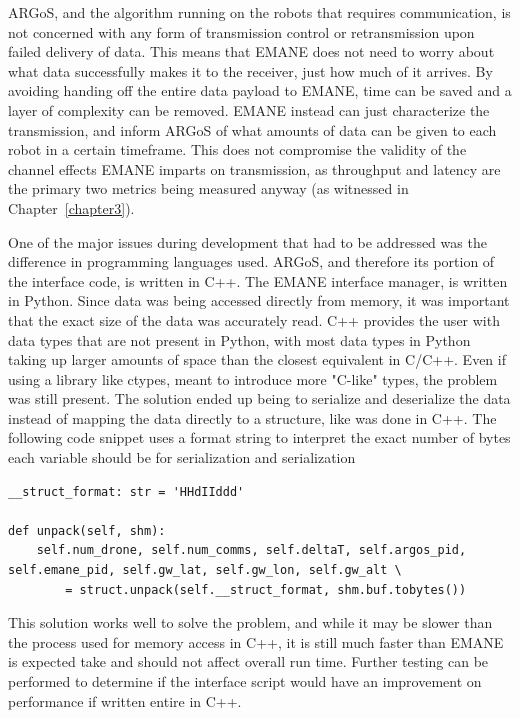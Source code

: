 ARGoS, and the algorithm running on the robots that requires communication, is not concerned with any form of transmission control or retransmission upon failed delivery of data.
This means that EMANE does not need to worry about what data successfully makes it to the receiver, just how much of it arrives.
By avoiding handing off the entire data payload to EMANE, time can be saved and a layer of complexity can be removed.
EMANE instead can just characterize the transmission, and inform ARGoS of what amounts of data can be given to each robot in a certain timeframe.
This does not compromise the validity of the channel effects EMANE imparts on transmission, as throughput and latency are the primary two metrics being measured anyway (as witnessed in Chapter~\ref{chapter3}).\par
One of the major issues during development that had to be addressed was the difference in programming languages used.
ARGoS, and therefore its portion of the interface code, is written in C++.
The EMANE interface manager, is written in Python.
Since data was being accessed directly from memory, it was important that the exact size of the data was accurately read.
C++ provides the user with data types that are not present in Python, with most data types in Python taking up larger amounts of space than the closest equivalent in C/C++.
Even if using a library like ctypes, meant to introduce more "C-like" types, the problem was still present.
The solution ended up being to serialize and deserialize the data instead of mapping the data directly to a structure, like was done in C++.
The following code snippet uses a format string to interpret the exact number of bytes each variable should be for serialization and serialization
\begin{verbatim}
__struct_format: str = 'HHdIIddd'

def unpack(self, shm):
	self.num_drone, self.num_comms, self.deltaT, self.argos_pid, self.emane_pid, self.gw_lat, self.gw_lon, self.gw_alt \
		= struct.unpack(self.__struct_format, shm.buf.tobytes())
\end{verbatim}
This solution works well to solve the problem, and while it may be slower than the process used for memory access in C++, it is still much faster than EMANE is expected take and should not affect overall run time.
Further testing can be performed to determine if the interface script would have an improvement on performance if written entire in C++.

